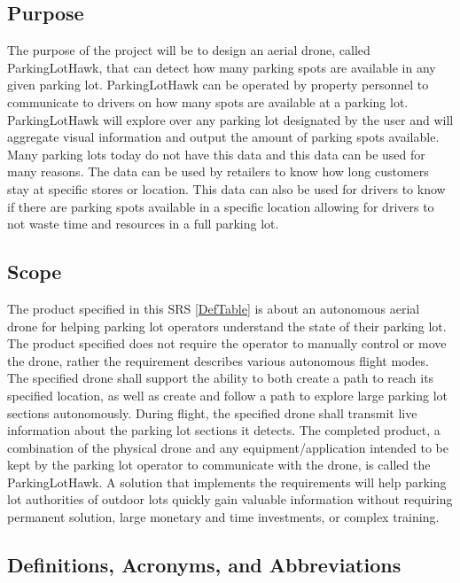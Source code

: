 \documentclass{article}
\begin{document}
\subsection{Purpose}
The purpose of the project will be to design an aerial drone, called ParkingLotHawk, that can detect how many parking spots are available in any given parking lot. ParkingLotHawk can be operated by property personnel to communicate to drivers on how many spots are available at a parking lot. ParkingLotHawk will explore over any parking lot designated by the user and will aggregate visual information and output the amount of parking spots available. Many parking lots today do not have this data and this data can be used for many reasons. The data can be used by retailers to know how long customers stay at specific stores or location. This data can also be used for drivers to know if there are parking spots available in a specific location allowing for drivers to not waste time and resources in a full parking lot. 
\subsection{Scope}
The product specified in this SRS \ref{DefTable} is about an autonomous aerial drone for helping parking lot operators understand the state of their parking lot. The product specified does not require the operator to manually control or move the drone, rather the requirement describes various autonomous flight modes. The specified drone shall support the ability to both create a path to reach its specified location, as well as create and follow a path to explore large parking lot sections autonomously. During flight, the specified drone shall transmit live information about the parking lot sections it detects. The completed product, a combination of the physical drone and any equipment/application intended to be kept by the parking lot operator to communicate with the drone, is called the ParkingLotHawk. A solution that implements the requirements will help parking lot authorities of outdoor lots quickly gain valuable information without requiring permanent solution, large monetary and time investments, or complex training. 



\subsection{Definitions, Acronyms, and Abbreviations}
\end{document}
